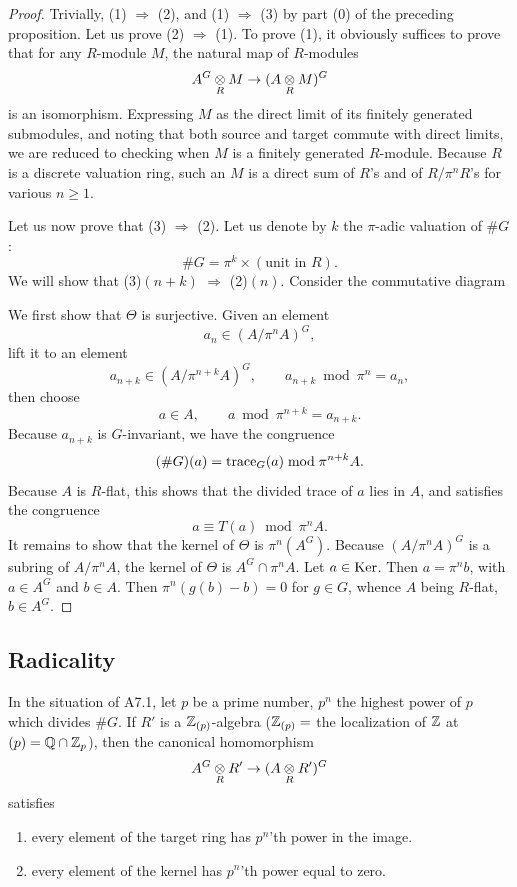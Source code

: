 \begin{proof}
Trivially, (1) $\Rightarrow$ (2), and (1) $\Rightarrow$ (3) by part (0) of the preceding proposition. Let us prove (2) $\Rightarrow$ (1). To prove (1), it obviously suffices to prove that for any $R$-module $M$, the natural map of $R$-modules
\[
A^G \underset{R}{\otimes} M \to (A \underset{R}{\otimes} M)^G
\]
is an isomorphism. Expressing $M$ as the direct limit of its finitely generated submodules, and noting that both source and target commute with direct limits, we are reduced to checking when $M$ is a finitely generated $R$-module. Because $R$ is a discrete valuation ring, such an $M$ is a direct sum of $R$'s and of $R/\pi^n R$'s for various $n \geq 1$.

Let us now prove that (3) $\Rightarrow$ (2). Let us denote by $k$ the $\pi$-adic valuation of $\#G$:
\[
\#G = \pi^k \times (\text{unit in } R) .
\]
We will show that (3)$(n+k)$ $\Rightarrow$ (2)$(n)$. Consider the commutative diagram
\begin{center}
\end{center}
We first show that $\Theta$ is surjective. Given an element
\[
a_n \in (A/\pi^n A)^G ,
\]
lift it to an element
\[
a_{n+k} \in (A/\pi^{n+k}A)^G , \qquad a_{n+k} \bmod \pi^n = a_n ,
\]
then choose
\[
a \in A , \qquad a \bmod \pi^{n+k} = a_{n+k} .
\]
Because $a_{n+k}$ is $G$-invariant, we have the congruence
\[
(\#G)(a) = \operatorname{trace}_G(a) \bmod \pi^{n+k}A .
\]
Because $A$ is $R$-flat, this shows that the divided trace of $a$ lies in $A$, and satisfies the congruence
\[
a \equiv T(a) \bmod \pi^n A .
\]
It remains to show that the kernel of $\Theta$ is $\pi^n(A^G)$. Because $(A/\pi^n A)^G$ is a subring of $A/\pi^n A$, the kernel of $\Theta$ is $A^G \cap \pi^n A$. Let $a \in \operatorname{Ker}$. Then $a = \pi^n b$, with $a \in A^G$ and $b \in A$. Then $\pi^n(g(b)-b) = 0$ for $g \in G$, whence $A$ being $R$-flat, $b \in A^G$.
\end{proof}

\subsection{Radicality}

\begin{appprop}[O. Gabber]\label{prop:A7.2.1}
In the situation of A7.1, let $p$ be a prime number, $p^n$ the highest power of $p$ which divides $\#G$. If $R'$ is a $\mathbb{Z}_{(p)}$-algebra ($\mathbb{Z}_{(p)} = $ the localization of $\mathbb{Z}$ at $(p) = \mathbb{Q} \cap \mathbb{Z}_p$), then the canonical homomorphism
\[
A^G \underset{R}{\otimes} R' \to (A \underset{R}{\otimes} R')^G
\]
satisfies
\begin{enumerate}[(1)]
\item every element of the target ring has $p^n$'th power in the image.
\item every element of the kernel has $p^n$'th power equal to zero.
\end{enumerate}
\end{appprop}

